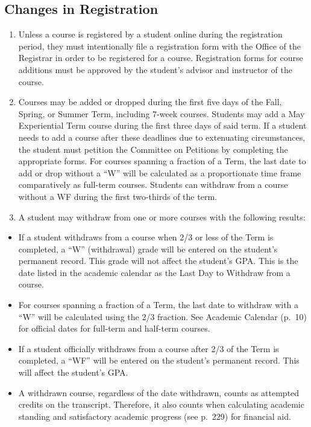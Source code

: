 \documentclass[
  letterpaper,
]{scrbook}
\providecommand{\tightlist}{%
  \setlength{\itemsep}{0pt}\setlength{\parskip}{0pt}}
\begin{document}
\subsection{Changes in Registration}\label{changes-in-registration}

\begin{enumerate}
\def\labelenumi{\arabic{enumi}.}
\tightlist
\item
  Unless a course is registered by a student online during the
  registration period, they must intentionally file a registration form
  with the Office of the Registrar in order to be registered for a
  course. Registration forms for course additions must be approved by
  the student's advisor and instructor of the course.
\item
  Courses may be added or dropped during the first five days of the
  Fall, Spring, or Summer Term, including 7-week courses. Students may
  add a May Experiential Term course during the first three days of said
  term. If a student needs to add a course after these deadlines due to
  extenuating circumstances, the student must petition the Committee on
  Petitions by completing the appropriate forms. For courses spanning a
  fraction of a Term, the last date to add or drop without a ``W'' will
  be calculated as a proportionate time frame comparatively as full-term
  courses. Students can withdraw from a course without a WF during the
  first two-thirds of the term.
\item
  A student may withdraw from one or more courses with the following
  results:
\end{enumerate}

\begin{itemize}
\tightlist
\item
  If a student withdraws from a course when 2/3 or less of the Term is
  completed, a ``W'' (withdrawal) grade will be entered on the student's
  permanent record. This grade will not affect the student's GPA. This
  is the date listed in the academic calendar as the Last Day to
  Withdraw from a course.\\
\item
  For courses spanning a fraction of a Term, the last date to withdraw
  with a ``W'' will be calculated using the 2/3 fraction. See Academic
  Calendar (p.~10) for official dates for full-term and half-term
  courses.
\item
  If a student officially withdraws from a course after 2/3 of the Term
  is completed, a ``WF'' will be entered on the student's permanent
  record. This will affect the student's GPA.
\item
  A withdrawn course, regardless of the date withdrawn, counts as
  attempted credits on the transcript. Therefore, it also counts when
  calculating academic standing and satisfactory academic progress (see
  p.~229) for financial aid.
\end{itemize}
\end{document}
